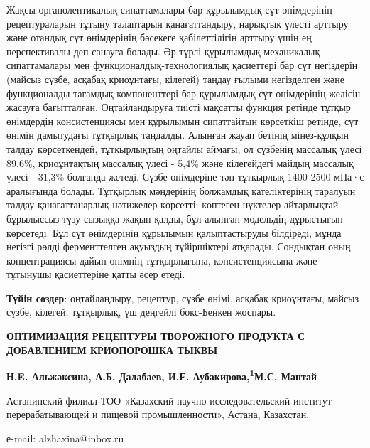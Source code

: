 Жақсы органолептикалық сипаттамалары бар құрылымдық сүт өнімдерінің
рецептураларын тұтыну талаптарын қанағаттандыру, нарықтық үлесті арттыру
және отандық сүт өнімдерінің бәсекеге қабілеттілігін арттыру үшін ең
перспективалы деп санауға болады. Әр түрлі құрылымдық-механикалық
сипаттамалары мен функционалдық-технологиялық қасиеттері бар сүт
негіздерін (майсыз сүзбе, асқабақ криоұнтағы, кілегей) таңдау ғылыми
негізделген және функционалды тағамдық компоненттері бар құрылымдық сүт
өнімдерінің желісін жасауға бағытталған. Оңтайландыруға тиісті мақсатты
функция ретінде тұтқыр өнімдердің консистенциясы мен құрылымын
сипаттайтын көрсеткіш ретінде, сүт өнімін дамытудағы тұтқырлық таңдалды.
Алынған жауап бетінің мінез-құлқын талдау көрсеткендей, тұтқырлықтың
оңтайлы аймағы, ол сүзбенің массалық үлесі 89,6\%, криоұнтақтың массалық
үлесі - 5,4\% және кілегейдегі майдың массалық үлесі - 31,3\% болғанда
жетеді. Сүзбе өнімдеріне тән тұтқырлық 1400-2500 мПа·с аралығында
болады. Тұтқырлық мәндерінің болжамдық қателіктерінің таралуын талдау
қанағаттанарлық нәтижелер көрсетті: көптеген нүктелер айтарлықтай
бұрылыссыз түзу сызыққа жақын қалды, бұл алынған модельдің дұрыстығын
көрсетеді. Бұл сүт өнімдерінің құрылымын қалыптастыруды білдіреді, мұнда
негізгі рөлді ферменттелген ақуыздың түйіршіктері атқарады. Сондықтан
оның концентрациясы дайын өнімнің тұтқырлығына, консистенциясына және
тұтынушы қасиеттеріне қатты әсер етеді.

{\bfseries Түйін сөздер}: оңтайландыру, рецептур, сүзбе өнімі, асқабақ
криоұнтағы, майсыз сүзбе, кілегей, тұтқырлық, үш деңгейлі бокс-Бенкен
жоспары.

{\bfseries ОПТИМИЗАЦИЯ РЕЦЕПТУРЫ ТВОРОЖНОГО ПРОДУКТА С ДОБАВЛЕНИЕМ
КРИОПОРОШКА ТЫКВЫ}

{\bfseries Н.E. Альжаксина\textsuperscript{\envelope }, А.Б. Далабаев, И.Е.
Аубакирова,\textsuperscript{1}М.С. Мантай}

Астанинский филиал ТОО «Казахский научно-исследовательский институт
перерабатывающей и пищевой промышленности», Астана, Казахстан,

е-mail: alzhaxina@inbox.ru

